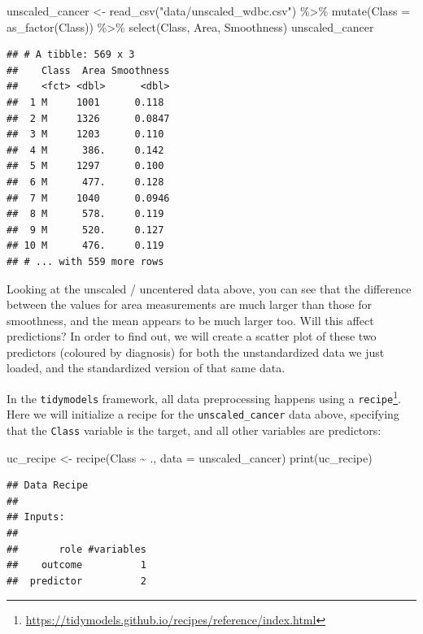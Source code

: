 \documentclass[
]{krantz}
\makeatletter
\newenvironment{Shaded}{\begin{snugshade}}{\end{snugshade}}
\newcommand{\AttributeTok}[1]{\textcolor[rgb]{0.61,0.61,0.61}{#1}}
\newcommand{\FunctionTok}[1]{\textcolor[rgb]{0,0,0}{#1}}
\newcommand{\NormalTok}[1]{#1}
\newcommand{\OtherTok}[1]{\textcolor[rgb]{0.37,0.37,0.37}{#1}}
\newcommand{\SpecialCharTok}[1]{\textcolor[rgb]{0,0,0}{#1}}
\newcommand{\StringTok}[1]{\textcolor[rgb]{0.5,0.5,0.5}{#1}}
\renewcommand{\href}[2]{#2\footnote{\url{#1}}}
\newenvironment{kframe}{%
\medskip{}
\setlength{\fboxsep}{.8em}
 \def\at@end@of@kframe{}%
 \ifinner\ifhmode%
  \def\at@end@of@kframe{\end{minipage}}%
  \begin{minipage}{\columnwidth}%
 \fi\fi%
 \def\FrameCommand##1{\hskip\@totalleftmargin \hskip-\fboxsep
 \colorbox{shadecolor}{##1}\hskip-\fboxsep
     \hskip-\linewidth \hskip-\@totalleftmargin \hskip\columnwidth}%
 \MakeFramed {\advance\hsize-\width
   \@totalleftmargin\z@ \linewidth\hsize
   \@setminipage}}%
 {\par\unskip\endMakeFramed%
 \at@end@of@kframe}
\renewenvironment{Shaded}{\begin{kframe}}{\end{kframe}}
\makeatother
\begin{document}
\begin{Shaded}
\begin{Highlighting}[]
\NormalTok{unscaled\_cancer }\OtherTok{\textless{}{-}} \FunctionTok{read\_csv}\NormalTok{(}\StringTok{"data/unscaled\_wdbc.csv"}\NormalTok{) }\SpecialCharTok{\%\textgreater{}\%}
  \FunctionTok{mutate}\NormalTok{(}\AttributeTok{Class =} \FunctionTok{as\_factor}\NormalTok{(Class)) }\SpecialCharTok{\%\textgreater{}\%}
  \FunctionTok{select}\NormalTok{(Class, Area, Smoothness)}
\NormalTok{unscaled\_cancer}
\end{Highlighting}
\end{Shaded}

\begin{verbatim}
## # A tibble: 569 x 3
##    Class  Area Smoothness
##    <fct> <dbl>      <dbl>
##  1 M     1001      0.118 
##  2 M     1326      0.0847
##  3 M     1203      0.110 
##  4 M      386.     0.142 
##  5 M     1297      0.100 
##  6 M      477.     0.128 
##  7 M     1040      0.0946
##  8 M      578.     0.119 
##  9 M      520.     0.127 
## 10 M      476.     0.119 
## # ... with 559 more rows
\end{verbatim}

Looking at the unscaled / uncentered data above, you can see that the difference
between the values for area measurements are much larger than those for
smoothness, and the mean appears to be much larger too. Will this affect
predictions? In order to find out, we will create a scatter plot of these two
predictors (coloured by diagnosis) for both the unstandardized data we just
loaded, and the standardized version of that same data.

In the \texttt{tidymodels} framework, all data preprocessing happens using a \href{https://tidymodels.github.io/recipes/reference/index.html}{\texttt{recipe}}.
Here we will initialize a recipe for the \texttt{unscaled\_cancer} data above, specifying
that the \texttt{Class} variable is the target, and all other variables are predictors:

\begin{Shaded}
\begin{Highlighting}[]
\NormalTok{uc\_recipe }\OtherTok{\textless{}{-}} \FunctionTok{recipe}\NormalTok{(Class }\SpecialCharTok{\textasciitilde{}}\NormalTok{ ., }\AttributeTok{data =}\NormalTok{ unscaled\_cancer)}
\FunctionTok{print}\NormalTok{(uc\_recipe)}
\end{Highlighting}
\end{Shaded}

\begin{verbatim}
## Data Recipe
## 
## Inputs:
## 
##       role #variables
##    outcome          1
##  predictor          2
\end{verbatim}
\end{document}

